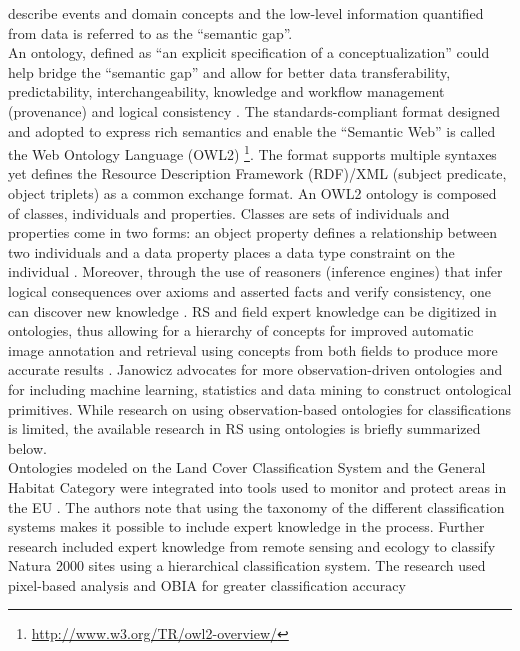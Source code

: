 \documentclass[authoryear, review,12pt,number]{elsarticle}
\begin{document}
describe events and domain concepts and the low-level information quantified 
from data is referred to as the ``semantic gap''.
\\
An ontology, defined as ``an explicit specification of a conceptualization''
\citep{gruber1993} could help bridge the ``semantic gap'' and allow for
better data transferability, predictability, interchangeability, knowledge
and workflow management (provenance) and logical 
consistency \citep{Janowicz2012}.
The standards-compliant format designed and adopted to express rich semantics 
and enable the ``Semantic Web'' is called the Web Ontology 
Language (OWL2) \footnote{\url{http://www.w3.org/TR/owl2-overview/}}. The 
format supports multiple syntaxes yet defines the Resource Description 
Framework (RDF)/XML (subject predicate, object triplets) as a common exchange 
format. An OWL2 ontology is composed of classes, individuals 
and properties. Classes are sets of individuals and properties come in 
two forms: an object property defines a relationship between two individuals 
and a data property  places a data type constraint on the 
individual \citep{OWL2}.
Moreover, through the use of reasoners (inference engines) 
that infer logical consequences over axioms and asserted facts and verify 
consistency, one can discover new knowledge \citep{Arvor2013, Andres2013a}. RS 
and field expert knowledge can 
be digitized in ontologies, thus allowing for a hierarchy of concepts for 
improved automatic image annotation and retrieval using concepts from both 
fields to produce more accurate results 
\cite{Srikanth:2005:EOA:1076034.1076128}. Janowicz \citep{Janowicz2012} 
advocates for more observation-driven ontologies and for including machine 
learning, 
statistics and data mining to construct ontological primitives. While research 
on using observation-based ontologies for classifications is limited, the 
available research in RS using ontologies is briefly summarized below. \\
Ontologies modeled on the Land Cover Classification
System and the General Habitat Category were integrated into tools used to 
monitor and protect areas in the EU \citep{Arvor2013}. The authors note 
that using the taxonomy of the different classification systems
makes it possible to include expert knowledge in the process. 
Further research included expert knowledge from remote sensing and ecology to 
classify Natura 2000 sites using a hierarchical classification system. The 
research used pixel-based analysis and OBIA for greater classification accuracy 
\end{document}
